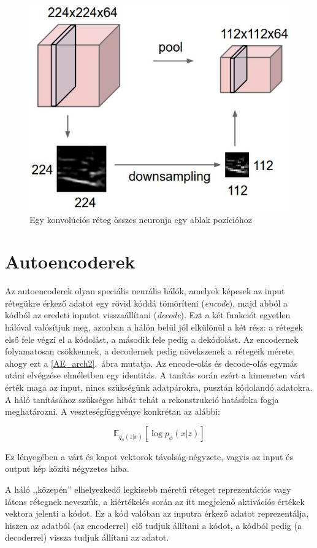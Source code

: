 \begin{figure}[h!]
\begin{center}
  
	\begin{center}
	\includegraphics[width=0.5\linewidth]{pool.jpeg}
	\end{center}
	
  \caption{Egy konvolúciós réteg összes neuronja egy ablak pozícióhoz \cite{ConvNet}}\label{pool}
\end{center}
\end{figure}

\section{Autoencoderek}

Az autoencoderek olyan speciális neurális hálók, amelyek képesek az input rétegükre érkező adatot egy rövid kóddá tömöríteni (\emph{encode}), majd abból a kódból az eredeti inputot visszaállítani (\emph{decode}). Ezt a két funkciót egyetlen hálóval valósítjuk meg, azonban a hálón belül jól elkülönül a két rész: a rétegek első fele végzi el a kódolást, a második fele pedig a dekódolást. Az encodernek folyamatosan csökkennek, a decodernek pedig növekszenek a rétegeik mérete, ahogy ezt a \ref{AE_arch2}.~ábra mutatja. Az encode-olás és decode-olás egymás utáni elvégzése elméletben egy identitás. A tanítás során ezért a kimeneten várt érték maga az input, nincs szükségünk adatpárokra, pusztán kódolandó adatokra. A háló tanításához szükséges hibát tehát a rekonstrukció hatásfoka fogja meghatározni. A veszteségfüggvénye konkrétan az alábbi:

$$ \mathbb{E}_{q_\phi(z|x)} [\log p_\phi(x|z)]$$

Ez lényegében a várt és kapot vektorok távolság-négyzete, vagyis az input és output kép közíti négyzetes hiba. 

A háló ,,közepén'' elhelyezkedő legkisebb méretű réteget reprezentációs vagy látens rétegnek nevezzük, a kiértékelés során az itt megjelenő aktivációs értékek vektora jelenti a kódot. Ez a kód valóban az inputra érkező adatot reprezentálja, hiszen az adatból (az encoderrel) elő tudjuk állítani a kódot, a kódból pedig (a decoderrel) vissza tudjuk állítani az adatot.

